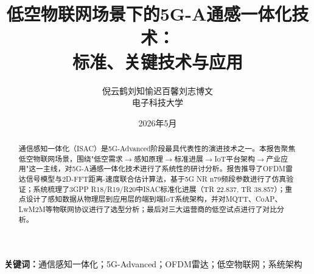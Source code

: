 \documentclass[12pt,a4paper]{ctexart}
\title{\textbf{低空物联网场景下的5G-A通感一体化技术：\\标准、关键技术与应用}}
\author{倪云鹤\quad 刘知愉\quad 迟百馨\quad 刘志博文\\[6pt] 电子科技大学}
\date{2026年5月}
\begin{document}
\maketitle\thispagestyle{empty}\newpage
\setcounter{page}{1}
\tableofcontents\newpage

\begin{abstract}
通信感知一体化（ISAC）是5G-Advanced阶段最具代表性的演进技术之一。本报告聚焦低空物联网场景，围绕"低空需求$\to$感知原理$\to$标准进展$\to$IoT平台架构$\to$产业应用"这一主线，对5G-A通感一体化技术进行了系统性的研讨分析。报告推导了OFDM雷达信号模型与2D-FFT距离-速度联合估计算法，基于5G NR n79频段参数进行了仿真验证；系统梳理了3GPP R18/R19/R20中ISAC标准化进展（TR 22.837, TR 38.857）；重点设计了感知数据从物理层到应用层的端到端IoT系统架构，并对MQTT、CoAP、LwM2M等物联网协议进行了选型分析；最后对三大运营商的低空试点进行了对比分析。
\end{abstract}
\textbf{关键词：}通信感知一体化；5G-Advanced；OFDM雷达；低空物联网；系统架构









\end{document}
